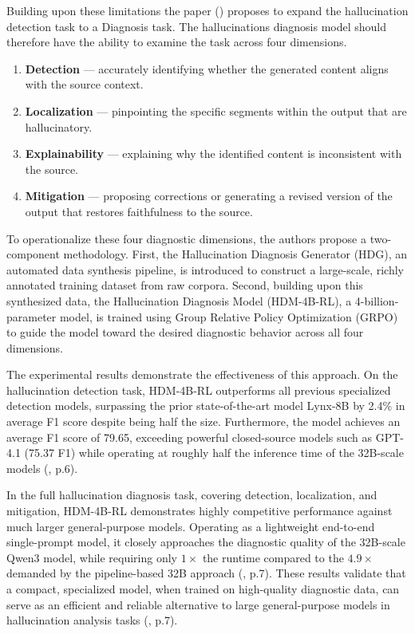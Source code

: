 \documentclass[
  seminar,   	 
  english,   	 
  titlepage=on,
  captions=tableheadings
]{ttlab-qualify}
\begin{document}
Building upon these limitations the paper (\cite{liu2025detection}) proposes to expand the hallucination detection task to a Diagnosis task. The hallucinations diagnosis model should therefore have the ability to examine the task across four dimensions.
\begin{enumerate}
	\item \textbf{Detection} --- accurately identifying whether the generated content aligns with the source context.
	\item \textbf{Localization} --- pinpointing the specific segments within the output that are hallucinatory.
	\item \textbf{Explainability} --- explaining why the identified content is inconsistent with the source.
	\item \textbf{Mitigation} --- proposing corrections or generating a revised version of the output that restores faithfulness to the source.
\end{enumerate}

To operationalize these four diagnostic dimensions, the authors propose
a two-component methodology. First, the Hallucination Diagnosis
Generator (HDG), an automated data synthesis pipeline, is introduced to
construct a large-scale, richly annotated training dataset from raw corpora.
Second, building upon this synthesized data, the Hallucination
Diagnosis Model (HDM-4B-RL), a 4-billion-parameter model, is trained
using Group Relative Policy Optimization (GRPO) to guide the model toward
the desired diagnostic behavior across all four dimensions.

The experimental results demonstrate the effectiveness of this approach.
On the hallucination detection task, HDM-4B-RL outperforms all previous
specialized detection models, surpassing the prior state-of-the-art model
Lynx-8B by 2.4\% in average F1 score despite being half the size.
Furthermore, the model achieves an average F1 score of 79.65, exceeding
powerful closed-source models such as GPT-4.1 (75.37 F1) while operating
at roughly half the inference time of the 32B-scale models (\cite{liu2025detection}, p.6).

In the full hallucination diagnosis task, covering detection, localization,
and mitigation, HDM-4B-RL demonstrates highly competitive performance
against much larger general-purpose models. Operating as a lightweight
end-to-end single-prompt model, it closely approaches the diagnostic
quality of the 32B-scale Qwen3 model, while requiring only $1\times$
the runtime compared to the $4.9\times$ demanded by the pipeline-based
32B approach (\cite{liu2025detection}, p.7). These results validate that a compact, specialized model,
when trained on high-quality diagnostic data, can serve as an efficient
and reliable alternative to large general-purpose models in hallucination
analysis tasks (\cite{liu2025detection}, p.7).
\end{document}

